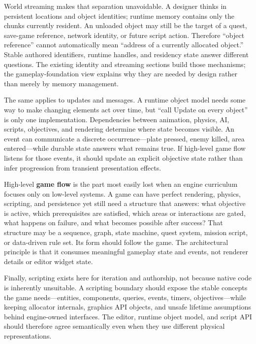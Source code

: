 World streaming makes that separation unavoidable. A designer thinks in persistent locations and object identities; runtime memory contains only the chunks currently resident. An unloaded object may still be the target of a quest, save-game reference, network identity, or future script action. Therefore ``object reference'' cannot automatically mean ``address of a currently allocated object.'' Stable authored identifiers, runtime handles, and residency state answer different questions. The existing identity and streaming sections build those mechanisms; the gameplay-foundation view explains why they are needed by design rather than merely by memory management.

The same applies to updates and messages. A runtime object model needs some way to make changing elements act over time, but ``call Update on every object'' is only one implementation. Dependencies between animation, physics, AI, scripts, objectives, and rendering determine where state becomes visible. An event can communicate a discrete occurrence---plate pressed, enemy killed, area entered---while durable state answers what remains true. If high-level game flow listens for those events, it should update an explicit objective state rather than infer progression from transient presentation effects.

High-level \textbf{game flow} is the part most easily lost when an engine curriculum focuses only on low-level systems. A game can have perfect rendering, physics, scripting, and persistence yet still need a structure that answers: what objective is active, which prerequisites are satisfied, which areas or interactions are gated, what happens on failure, and what becomes possible after success? That structure may be a sequence, graph, state machine, quest system, mission script, or data-driven rule set. Its form should follow the game. The architectural principle is that it consumes meaningful gameplay state and events, not renderer details or editor widget state.

Finally, scripting exists here for iteration and authorship, not because native code is inherently unsuitable. A scripting boundary should expose the stable concepts the game needs---entities, components, queries, events, timers, objectives---while keeping allocator internals, graphics API objects, and unsafe lifetime assumptions behind engine-owned interfaces. The editor, runtime object model, and script API should therefore agree semantically even when they use different physical representations.

